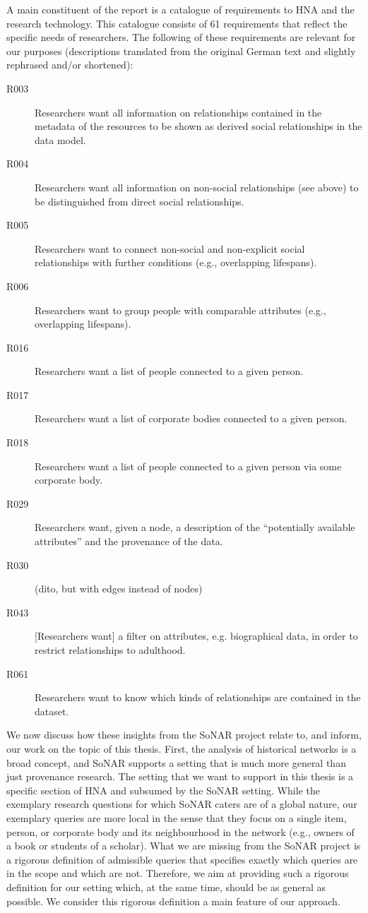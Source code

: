 A main constituent of the report is a catalogue of requirements
to HNA and the research technology. This catalogue consists of 61
requirements that reflect the specific needs of researchers.
The following of these requirements are relevant for our purposes
(descriptions translated from the original German text and slightly rephrased and/or shortened):
%
\begin{description}
  \item[R003]
    Researchers want all information on relationships contained in the metadata of the resources
    to be shown as derived social relationships in the data model.
  \item[R004]
    Researchers want all information on non-social
    relationships (see above) to be distinguished from direct social relationships.
  \item[R005]
    Researchers want to connect non-social and non-explicit social relationships
    with further conditions (e.g., overlapping lifespans).
  \item[R006]
    Researchers want to group people with comparable attributes (e.g., overlapping lifespans).
  \item[R016]
    Researchers want a list of people connected to a given person.
  \item[R017]
    Researchers want a list of corporate bodies connected to a given person.
  \item[R018]
    Researchers want a list of people connected to a given person via some corporate body.
  \item[R029]
    Researchers want, given a node, a description of the \enquote{potentially available attributes}
    and the provenance of the data.
  \item[R030]
    (dito, but with edges instead of nodes)
  \item[R043]
    [Researchers want] a filter on attributes, e.g. biographical data, in order to
    restrict relationships to adulthood.
  \item[R061]
    Researchers want to know which kinds of relationships are contained in the dataset.
\end{description}

We now discuss how these insights from the SoNAR project relate to, and inform, our work on the topic of this thesis.
First, the analysis of historical networks is a broad concept, and SoNAR supports a setting
that is much more general than just provenance research.
The setting that we want to support in this thesis is a specific section of HNA and subsumed 
by the SoNAR setting.
While the exemplary research questions for which SoNAR caters are of a global nature,
our exemplary queries are more local in the sense that they focus on
a single item, person, or corporate body and its neighbourhood in the network
(e.g., owners of a book or students of a scholar). 
What we are missing from the SoNAR project is a rigorous definition of admissible queries
that specifies exactly which queries are in the scope and which are not.
Therefore, we aim at providing such a rigorous definition for our setting
which, at the same time, should be as general as possible. We consider this rigorous definition
a main feature of our approach.

